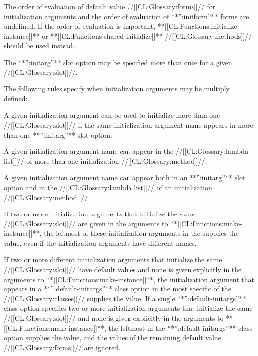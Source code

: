  The order of evaluation of default value //[[CL:Glossary:forms]]// for initialization arguments and the order of evaluation of **'':initform''** forms are undefined.  If the order of evaluation is important,  **[[CL:Functions:initialize-instance]]** or **[[CL:Functions:shared-initialize]]** //[[CL:Glossary:methods]]//  should be used instead.

\endsubsection%

 
      The **'':initarg''** slot option may be specified more than once for a given //[[CL:Glossary:slot]]//.

The following rules specify when initialization arguments may be multiply defined:

\beginlist

\itemitem{\bull} A given initialization argument can be used to initialize more than one //[[CL:Glossary:slot]]// if the same initialization argument name appears in more than one **'':initarg''** slot option.

\itemitem{\bull} A given initialization argument name can appear  in the //[[CL:Glossary:lambda list]]// of more than one initialization //[[CL:Glossary:method]]//.

\itemitem{\bull} A given initialization argument name can appear both in an **'':initarg''** slot option and  in the //[[CL:Glossary:lambda list]]// of an initialization //[[CL:Glossary:method]]//.

\endlist


If two or more initialization arguments that initialize the same //[[CL:Glossary:slot]]// are given in the arguments to **[[CL:Functions:make-instance]]**, the leftmost of these initialization arguments in the  supplies the value, even if the initialization arguments have different names.

If two or more different initialization arguments that initialize the same //[[CL:Glossary:slot]]// have default values and none is given explicitly in the arguments to **[[CL:Functions:make-instance]]**, the initialization argument that appears in a **'':default-initargs''** class option in the most specific of the //[[CL:Glossary:classes]]// supplies the value. If a single **'':default-initargs''** class option specifies two or more initialization arguments that initialize the same //[[CL:Glossary:slot]]// and none is given explicitly in the arguments to **[[CL:Functions:make-instance]]**, the leftmost in the **'':default-initargs''** class option supplies the value, and the values of the remaining default value //[[CL:Glossary:forms]]// are ignored.

